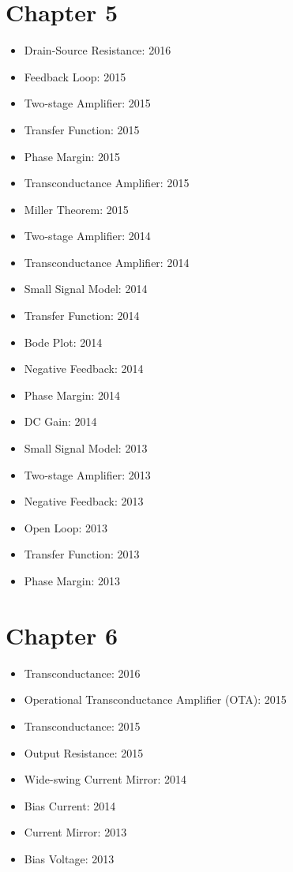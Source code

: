 \documentclass[twocolumn]{article}
\begin{document}
  \section*{Chapter 5}
    \begin{itemize}
      \item Drain-Source Resistance: 2016

      \item Feedback Loop: 2015
      \item Two-stage Amplifier: 2015
      \item Transfer Function: 2015
      \item Phase Margin: 2015
      \item Transconductance Amplifier: 2015
      \item Miller Theorem: 2015

      \item Two-stage Amplifier: 2014
      \item Transconductance Amplifier: 2014
      \item Small Signal Model: 2014
      \item Transfer Function: 2014
      \item Bode Plot: 2014
      \item Negative Feedback: 2014
      \item Phase Margin: 2014
      \item DC Gain: 2014

      \item Small Signal Model: 2013
      \item Two-stage Amplifier: 2013
      \item Negative Feedback: 2013
      \item Open Loop: 2013
      \item Transfer Function: 2013
      \item Phase Margin: 2013
    \end{itemize}
  \section*{Chapter 6}
    \begin{itemize}
      \item Transconductance: 2016

      \item Operational Transconductance Amplifier (OTA): 2015
      \item Transconductance: 2015
      \item Output Resistance: 2015

      \item Wide-swing Current Mirror: 2014
      \item Bias Current: 2014

      \item Current Mirror: 2013
      \item Bias Voltage: 2013
    \end{itemize}
\end{document}
